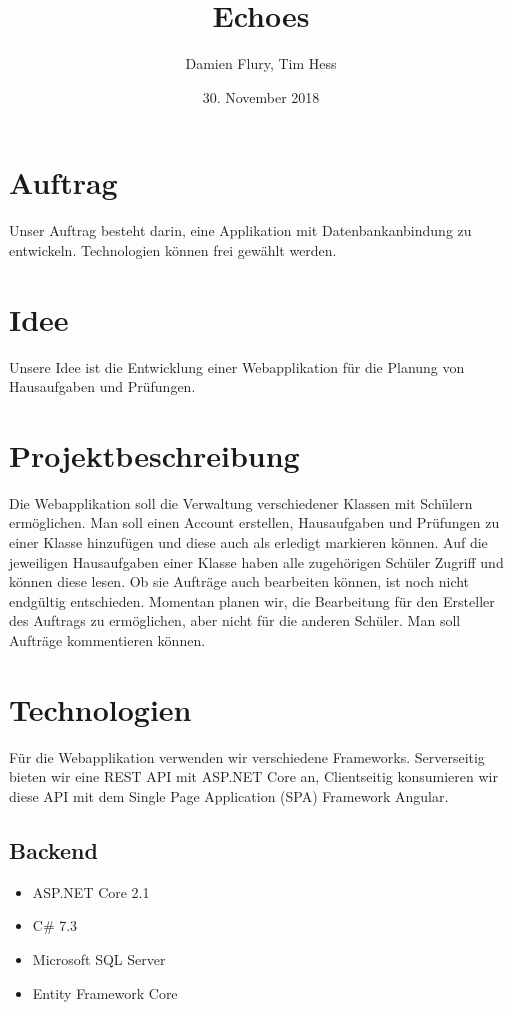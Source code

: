 \documentclass[a4paper, titlepage]{article}
\title{Echoes}
\author{Damien Flury, Tim Hess}
\date{30. November 2018}
\begin{document}
    \maketitle
    \tableofcontents
    \newpage
    
    \section{Auftrag}
    Unser Auftrag besteht darin, eine Applikation mit Datenbankanbindung zu entwickeln. Technologien
    können frei gewählt werden.
    \section{Idee}
    Unsere Idee ist die Entwicklung einer Webapplikation für die Planung von Hausaufgaben
    und Prüfungen. 
    \section{Projektbeschreibung}
    Die Webapplikation soll die Verwaltung verschiedener Klassen mit Schülern ermöglichen.
    Man soll einen Account erstellen, Hausaufgaben und Prüfungen zu einer Klasse hinzufügen
    und diese auch als erledigt markieren können. Auf die jeweiligen Hausaufgaben einer Klasse
    haben alle zugehörigen Schüler Zugriff und können diese lesen. Ob sie Aufträge auch bearbeiten
    können, ist noch nicht endgültig entschieden. Momentan planen wir, die Bearbeitung für den Ersteller
    des Auftrags zu ermöglichen, aber nicht für die anderen Schüler. Man soll Aufträge kommentieren
    können.
    \section{Technologien}
    Für die Webapplikation verwenden wir verschiedene Frameworks. Serverseitig bieten wir
    eine REST API mit ASP.NET Core an, Clientseitig konsumieren wir diese API mit dem Single
    Page Application (SPA) Framework Angular.
    \subsection{Backend}
    \begin{itemize}
        \item ASP.NET Core 2.1
        \item C\# 7.3
        \item Microsoft SQL Server
        \item Entity Framework Core
    \end{itemize}
\end{document}
